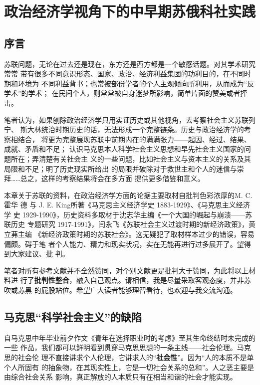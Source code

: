 \chapter[中早期苏俄科社实践]{政治经济学视角下的中早期苏俄科社实践}
\label{chap:russiachina}

\section{序言}

苏联问题，无论在过去还是现在，东方还是西方都是一个敏感话题。对其学术研究常常
带有很多不同意识形态、国家、政治、经济利益集团的功利目的，在不同时期和环境为
不同利益背书；也常被部份学者的个人主观倾向所利用，从而成为“反学术”的学术；
在民间个人，则常常被自身迷梦所影响，简单片面的赞美或者抨击。

笔者认为，如果刨除政治经济学只用实证历史或其他视角，去考察社会主义苏联列宁、
斯大林统治时期历史的话，无法形成一个完整链条。历史与政治经济学的考察相结合，
将更为完整展现苏联中前期内在的满满张力——起因、经过、结果、成就、矛盾和不足；
认识马克思本人科学社会主义思想和早先社会主义国家的问题所在；弄清楚有关社会主
义的一些问题，比如社会主义与资本主义的关系及其局限和不足；明了历史现实所给出
的局限并破除对于救世主和个人的迷信与崇拜……总之，这样的考察结果将会在多方面
提供更多借鉴和意义。

本章关于苏联的资料，在政治经济学方面的论据主要取材自批判色彩浓厚的M. C. 霍华
德 与 J. E. King所著《马克思主义经济学史 1883-1929》、《马克思主义经济学
史 1929-1990》，历史资料多取材于沈志华主编《一个大国的崛起与崩溃——苏联历史
专题研究 1917-1991》，闫永飞《苏联社会主义过渡时期的新经济政策》，黄立茀主编
《新经济政策时期的苏联社会》。这无疑犯了取材样本过少的错误，容易偏颇。碍于笔
者个人能力、精力和现实状况，实在无能再进行过多展开了。望得到大家建议、批
判。

笔者对所有参考文献并不全然赞同，对个别文献更是批判大于赞同，为此将以上材料进
行了\textbf{批判性整合}，融入自己观点。请相信，我是尽量采取客观态度，并非苏吹或苏黑
的屁股站位。希望广大读者能够理智看待，也欢迎与我交流沟通。

\section{马克思“科学社会主义”的缺陷}
\label{sec:marxkexue}

自马克思中年毕业前夕作文《青年在选择职业时的考虑》至其生命终结时未完成的一些
作品，我们都可以鲜明看到贯穿马克思思想的一条主线——社会伦理。马克思的社会伦
理不直接讲求个人伦理，它讲求人的“\textbf{社会性}”。因为“人的本质不是单个人所固有
的抽象物，在其现实性上，它是一切社会关系的总和”。人之恶主要是由综合社会关系
影响，真正解放的人本质只有在相当和谐的社会才能实现。

